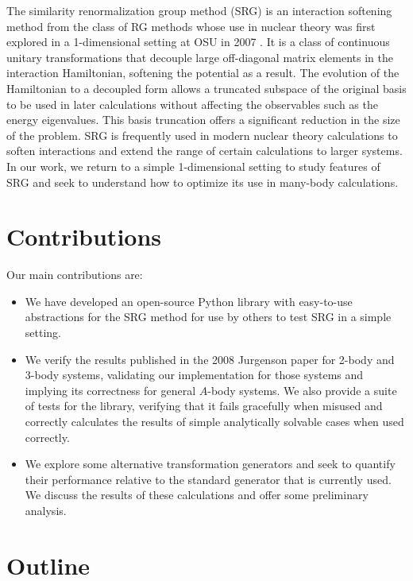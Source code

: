 The similarity renormalization group method (SRG) is an interaction softening method from the class of RG methods whose use in nuclear theory was first explored in a 1-dimensional setting at OSU in 2007 \cite{Jurgenson:2007td}. It is a class of continuous unitary transformations that decouple large off-diagonal matrix elements in the interaction Hamiltonian, softening the potential as a result. The evolution of the Hamiltonian to a decoupled form allows a truncated subspace of the original basis to be used in later calculations without affecting the observables such as the energy eigenvalues. This basis truncation offers a significant reduction in the size of the problem. SRG is frequently used in modern nuclear theory calculations to soften interactions and extend the range of certain calculations to larger systems. In our work, we return to a simple 1-dimensional setting to study features of SRG and seek to understand how to optimize its use in many-body calculations.

\section{Contributions}

Our main contributions are:
\begin{itemize}
    \item{We have developed an open-source Python library with easy-to-use abstractions for the SRG method for use by others to test SRG in a simple setting.}
    \item{We verify the results published in the 2008 Jurgenson paper for 2-body and 3-body systems, validating our implementation for those systems and implying its correctness for general $A$-body systems. We also provide a suite of tests for the library, verifying that it fails gracefully when misused and correctly calculates the results of simple analytically solvable cases when used correctly.}
    \item{We explore some alternative transformation generators and seek to quantify their performance relative to the standard generator that is currently used. We discuss the results of these calculations and offer some preliminary analysis.}
\end{itemize}

\section{Outline}

